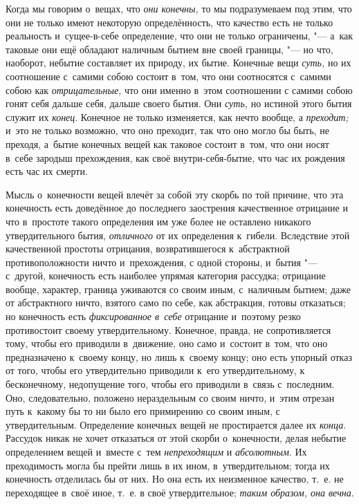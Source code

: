 Когда мы говорим о~вещах, что {\em они конечны,} то мы
подразумеваем под этим, что они не только имеют некоторую определённость,
что качество есть не только реальность и~сущее-в-себе определение, что они не
только ограничены, "--- а~как таковые они ещё обладают наличным бытием вне
своей границы, "--- но что, наоборот, небытие составляет их природу, их бытие.
Конечные вещи {\em суть,} но их соотношение с~самими
собою состоит в~том, что они соотносятся с~самими собою как
{\em отрицательные,} что они именно в~этом соотношении
с самими собою гонят себя дальше себя, дальше своего бытия. Они
{\em суть,} но истиной этого бытия служит их
{\em конец}. Конечное не только изменяется, как нечто
вообще, а {\em преходит;} и~это не только возможно, что
оно преходит, так что оно могло бы быть, не преходя, а~бытие конечных вещей
как таковое состоит в~том, что они носят в~себе зародыш прехождения, как
своё внутри-себя-бытие, что час их рождения есть час их смерти.

\label{ssssec:alpha}

Мысль о~конечности вещей влечёт за собой эту скорбь по той причине, что эта
конечность есть доведённое до последнего заострения качественное отрицание
и что в~простоте такого определения им уже более не оставлено никакого
утвердительного бытия, {\em отличного} от их
определения к~гибели. Вследствие этой качественной простоты отрицания,
возвратившегося к~абстрактной противоположности ничто и~прехождения, с
одной стороны, и~бытия "--- с~другой, конечность есть наиболее упрямая
категория рассудка; отрицание вообще, характер, граница уживаются со своим
иным, с~наличным бытием; даже от абстрактного ничто, взятого само по
себе, как абстракция, готовы отказаться; но конечность есть
{\em фиксированное в~себе} отрицание и~поэтому резко
противостоит своему утвердительному. Конечное, правда, не сопротивляется
тому, чтобы его приводили в~движение, оно само и~состоит в~том, что оно
предназначено к~своему концу, но лишь к~своему концу; оно есть упорный
отказ от того, чтобы его утвердительно приводили к~его утвердительному, к
бесконечному, недопущение того, чтобы его приводили в~связь с~последним.
Оно, следовательно, положено нераздельным со своим ничто, и~этим отрезан
путь к~какому бы то ни было его примирению со своим иным, с
утвердительным. Определение конечных вещей не простирается далее их
{\em конца}. Рассудок никак не хочет отказаться от этой
скорби о~конечности, делая небытие определением вещей и~вместе с~тем
{\em непреходящим} и
{\em абсолютным}. Их преходимость могла бы прейти лишь
в их ином, в~утвердительном; тогда их конечность отделилась бы от них. Но
она есть их неизменное качество, т.~е. не переходящее в~своё иное, т.~е.
в своё утвердительное; {\em таким образом, она вечна}.

